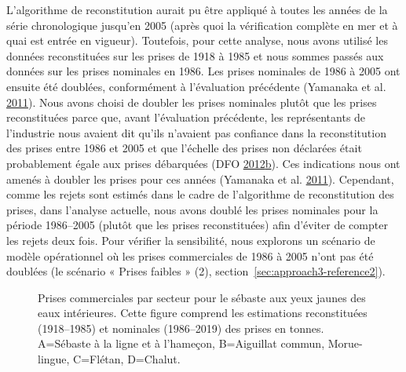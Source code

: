 \documentclass[french,11pt]{book}
\begin{document}
L'algorithme de reconstitution aurait pu être appliqué à toutes les années de la série chronologique jusqu'en 2005 (après quoi la vérification complète en mer et à quai est entrée en vigueur). Toutefois, pour cette analyse, nous avons utilisé les données reconstituées sur les prises de 1918 à 1985 et nous sommes passés aux données sur les prises nominales en 1986. Les prises nominales de 1986 à 2005 ont ensuite été doublées, conformément à l'évaluation précédente (Yamanaka et al. \protect\hyperlink{ref-yamanaka2011}{2011}). Nous avons choisi de doubler les prises nominales plutôt que les prises reconstituées parce que, avant l'évaluation précédente, les représentants de l'industrie nous avaient dit qu'ils n'avaient pas confiance dans la reconstitution des prises entre 1986 et 2005 et que l'échelle des prises non déclarées était probablement égale aux prises débarquées (DFO \protect\hyperlink{ref-dfo2012b}{2012}\protect\hyperlink{ref-dfo2012b}{b}). Ces indications nous ont amenés à doubler les prises pour ces années (Yamanaka et al. \protect\hyperlink{ref-yamanaka2011}{2011}). Cependant, comme les rejets sont estimés dans le cadre de l'algorithme de reconstitution des prises, dans l'analyse actuelle, nous avons doublé les prises nominales pour la période 1986--2005 (plutôt que les prises reconstituées) afin d'éviter de compter les rejets deux fois. Pour vérifier la sensibilité, nous explorons un scénario de modèle opérationnel où les prises commerciales de 1986 à 2005 n'ont pas été doublées (le scénario « Prises faibles » (2), section~\ref{sec:approach3-reference2}).
\begin{figure}[htb]

{\centering {} 

}

\caption{Prises commerciales par secteur pour le sébaste aux yeux jaunes des eaux intérieures. Cette figure comprend les estimations reconstituées (1918--1985) et nominales (1986--2019) des prises en tonnes. A=Sébaste à la ligne et à l’hameçon, B=Aiguillat commun, Morue-lingue, C=Flétan, D=Chalut.}\label{fig:commcatch2}
\end{figure}
\clearpage
\end{document}
